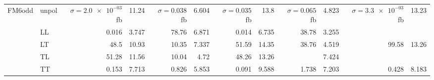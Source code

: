 \begin{table}[H]
{\begin{tabular}{llrrrrrrrrrr}
\midrule
\multirow{5}{*}{FM6odd}
 & unpol & $\sigma = \num{2.0e-03}$ fb & \num{11.24} & $\sigma = \num{0.038}$ fb & \num{6.604} & $\sigma = \num{0.035}$ fb & \num{13.8} & $\sigma = \num{0.065}$ fb & \num{4.823} & $\sigma = \num{3.3e-03}$ fb & \num{13.23} \\
 & LL & \num{0.016} & \num{3.747} & \num{78.76} & \num{6.871} & \num{0.014} & \num{6.735} & \num{38.78} & \num{3.255} &  &  \\
 & LT & \num{48.5} & \num{10.93} & \num{10.35} & \num{7.337} & \num{51.59} & \num{14.35} & \num{38.76} & \num{4.519} & \num{99.58} & \num{13.26} \\
 & TL & \num{51.28} & \num{11.56} & \num{10.04} & \num{4.72} & \num{48.26} & \num{13.26} &  & \num{7.424} &  &  \\
 & TT & \num{0.153} & \num{7.713} & \num{0.826} & \num{5.853} & \num{0.091} & \num{9.588} & \num{1.738} & \num{7.203} & \num{0.428} & \num{8.183} \\
\bottomrule
\end{tabular}
}%
\end{table}
